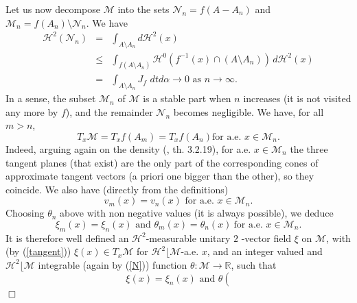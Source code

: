 \documentclass{article}
\newenvironment{proof}[1][Proof]{{\sc #1.} }{\hfill $\Box$}
\begin{document}
\begin{proof}
Let us now decompose $\mathcal{M}$ into the sets $\mathcal{N}_{n}=f\left(
A-A_{n}\right) $ and $\mathcal{M}_{n}=f\left( A_{n}\right) \setminus 
\mathcal{N}_{n}$. We have
\begin{eqnarray*}
\mathcal{H}^{2}\left( \mathcal{N}_{n}\right)  &=&\int_{A\setminus A_{n}}d%
\mathcal{H}^{2}\left( x\right)  \\
&\leq &\int_{f\left( A\setminus A_{n}\right) }\mathcal{H}^{0}\left(
f^{-1}\left( x\right) \cap \left( A\setminus A_{n}\right) \right) \,d%
\mathcal{H}^{2}\left( x\right)  \\
&=&\int_{A\setminus A_{n}}J_{f}\,\,dtd\alpha \rightarrow 0\text{ as }%
n\rightarrow \infty \text{.}
\end{eqnarray*}
In a sense, the subset $\mathcal{M}_{n}$ of $\mathcal{M}$ is a stable part
when $n$ increases (it is not visited any more by $f$), and the remainder $%
\mathcal{N}_{n}$ becomes negligible. We have, for all $m>n$,  
\begin{equation}
T_{x}\mathcal{M}=T_{x}f\left( A_{m}\right) =T_{x}f\left( A_{n}\right) \text{
for a.e. }x\in \mathcal{M}_{n}\text{.}  \label{tangent}
\end{equation}
Indeed, arguing again on the density (\cite{Fed}, th. 3.2.19), for a.e. $%
x\in \mathcal{M}_{n}$ the three tangent planes (that exist) are the only
part of the corresponding cones of approximate tangent vectors (a priori one
bigger than the other), so they coincide. We also have (directly from the
definitions)
\begin{equation*}
v_{m}\left( x\right) =v_{n}\left( x\right) \text{ for a.e. }x\in \mathcal{M}%
_{n}.
\end{equation*}
Choosing $\theta _{n}$ above with non negative values (it is always possible),
we deduce
\begin{equation*}
\xi _{m}\left( x\right) =\xi _{n}\left( x\right) \text{ and }\theta
_{m}\left( x\right) =\theta _{n}\left( x\right) \ \text{for a.e. }x\in 
\mathcal{M}_{n}.
\end{equation*}
It is therefore well defined an $\mathcal{H}^{2}$-measurable unitary $2$%
-vector field $\xi $ on $\mathcal{M}$, with (by (\ref{tangent}))  $\xi
\left( x\right) \in T_{x}\mathcal{M}$ for $\mathcal{H}^{2}\lfloor \mathcal{M}
$-a.e. $x$, and an integer valued and $\mathcal{H}^{2}\lfloor \mathcal{M}$
integrable (again by (\ref{N})) function $\theta :\mathcal{M}\rightarrow 
\mathbb{R}$, such that
\begin{equation*}
\xi \left( x\right) =\xi _{n}\left( x\right) \text{ and }\theta \left(

\end{equation*}
\end{proof}
\end{document}
